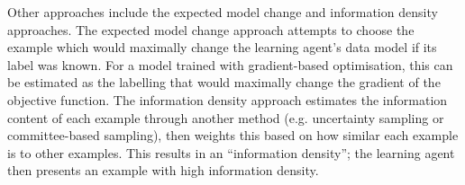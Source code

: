 \documentclass[a4paper]{article}
\begin{document}
            Other approaches include the expected model change and information density approaches. The expected model change approach attempts to choose the example which would maximally change the learning agent's data model if its label was known\cite{settles09}. For a model trained with gradient-based optimisation, this can be estimated as the labelling that would maximally change the gradient of the objective function\cite{settles08b}. The information density approach estimates the information content of each example through another method (e.g. uncertainty sampling or committee-based sampling), then weights this based on how similar each example is to other examples. This results in an ``information density''; the learning agent then presents an example with high information density\cite{settles08b}.


\end{document}
